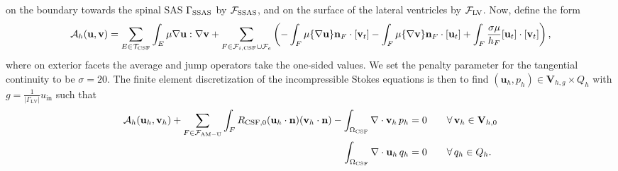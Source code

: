 \documentclass[fleqn,10pt]{wlscirep}
\begin{document}
 on the boundary towards the spinal SAS $\Gamma_{\rm SSAS}$ by
$\mathcal{F}_{\rm SSAS}$, and on the surface of the lateral ventricles by $\mathcal{F}_{\rm LV}$. Now, define the form 
\begin{multline}
  \mathcal{A}_h(\mathbf{u}, \mathbf{v})
  = \sum_{E \in \mathcal{T}_{\rm CSF}} \int_{E} \mu \nabla \mathbf{u} : \nabla \mathbf{v}
 + \sum_{F \in \mathcal{F}_{i, \rm CSF} \cup \mathcal{F}_{e}} \left (
  -\int_{F} \mu \{\nabla \mathbf{u}\}  \mathbf{n}_F \cdot [\mathbf{v}_t] 
  - %
  \int_{F} \mu \{\nabla \mathbf{v}\}  \mathbf{n}_F \cdot [\mathbf{u}_t]
  + %
\int_{F}   \frac{\sigma \mu}{h_F} [\mathbf{u}_t ] \cdot [\mathbf{v}_t] \right ),   
\end{multline}
where on exterior facets the average and jump operators take the one-sided values. We set the penalty parameter for the tangential continuity to be $\sigma = 20$. The finite element discretization of the incompressible Stokes equations is then to find $(\mathbf{u}_h, p_h) \in \mathbf{V}_{h,g} \times Q_h$ with $g  = \frac{1}{|\Gamma_{\mathrm{LV}}|} u_{\mathrm{in}}$  such that 
\begin{subequations}
\begin{align}
  \mathcal{A}_h(\mathbf{u}_h, \mathbf{v}_h)
  + \sum_{F \in \mathcal{F}_{\rm AM-U}} \int_{F} R_{\rm CSF, 0} (\mathbf{u}_h \cdot \mathbf{n}) (\mathbf{v}_h \cdot \mathbf{n})
  - \int_{\Omega_{\rm CSF}} \nabla \cdot \mathbf{v}_h \, p_h  &= 0 \qquad \forall \, \mathbf{v}_h \in \mathbf{V}_{h,0} \\ 
\int_{\Omega_{\rm CSF}} \nabla \cdot \mathbf{u}_h \, q_h  &= 0 \qquad \forall \, q_h \in Q_h.
\end{align}
\end{subequations}


\end{document}
